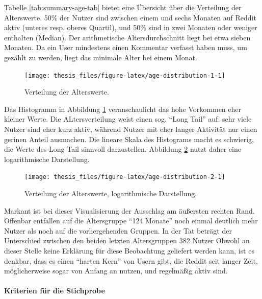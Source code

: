 \documentclass[11pt,a4paper,twoside]{article}
\let\oldpar\paragraph
\renewcommand{\paragraph}{\oldpar*}
\begin{document}
Tabelle \ref{tab:summary-age-tab} bietet eine Übersicht über die
Verteilung der Alterswerte. 50\% der Nutzer sind zwischen einem und
sechs Monaten auf Reddit aktiv (unteres resp. oberes Quartil), und 50\%
sind in zwei Monaten oder weniger enthalten (Median). Der arithmetische
Altersdurchschnitt liegt bei etwa sieben Monaten. Da ein User mindestens
einen Kommentar verfasst haben muss, um gezählt zu werden, liegt das
minimale Alter bei einem Monat.

\begin{figure}

{\centering \texttt{[image: thesis\_files/figure-latex/age-distribution-1-1]} 

}

\caption{Verteilung der Alterswerte.}\label{fig:age-distribution-1}
\end{figure}

Das Histogramm in Abbildung \ref{fig:age-distribution-1} veranschaulicht
das hohe Vorkommen eher kleiner Werte. Die ALtersverteilung weist einen
sog. \enquote{Long Tail} auf: sehr viele Nutzer sind eher kurz aktiv,
während Nutzer mit eher langer Aktivität nur einen gerinen Anteil
ausmachen. Die lineare Skala des Histograms macht es schwierig, die
Werte des Long Tail sinnvoll darzustellen. Abbildung
\ref{fig:age-distribution-2} nutzt daher eine logarithmische
Darstellung.

\begin{figure}

{\centering \texttt{[image: thesis\_files/figure-latex/age-distribution-2-1]} 

}

\caption{Verteilung der Alterswerte, logarithmische Darstellung.}\label{fig:age-distribution-2}
\end{figure}

Markant ist bei dieser Visualisierung der Ausschlag am äußersten rechten
Rand. Offenbar entfallen auf die Altersgruppe \enquote{124 Monate} noch
einmal deutlich mehr Nutzer als noch auf die vorhergehenden Gruppen. In
der Tat beträgt der Unterschied zwischen den beiden letzten
Altersgruppen 382 Nutzer Obwohl an dieser Stelle keine Erklärung für
diese Beobachtung geliefert werden kann, ist es denkbar, dass es einen
\enquote{harten Kern} von Usern gibt, die Reddit seit langer Zeit,
möglicherweise sogar von Anfang an nutzen, und regelmäßig aktiv sind.

\hypertarget{kriterien-fur-die-stichprobe}{%
\paragraph{Kriterien für die
Stichprobe}\label{kriterien-fur-die-stichprobe}}
\end{document}
